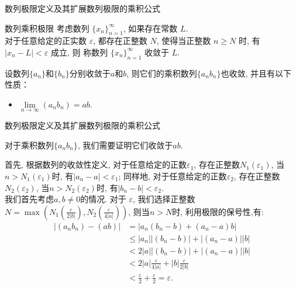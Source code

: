 \documentclass[
10pt,
aspectratio=43,
]{beamer}
\begin{document}
\begin{frame}{数列极限定义及其扩展}{数列极限的乘积公式}
    \begin{block}{数列乘积极限}
        考虑数列 $\{x_n\}_{n=1}^\infty$, 如果存在{\color{green}常数 $L$}.\\
        {\color{blue}对于任意给定的正实数 $\varepsilon$}, 都存在{\color{red}正整数 $N$, 使得当正整数 $n\geq N$ 时}, {\color{blue}有 $|x_n - L| < \varepsilon$ 成立}, 则{\color{green} 称数列 $\{x_n\}_{n=1}^\infty$ 收敛于 $L$}.
    \end{block}
    \begin{block}{}
        设数列$\{a_n\}$和$\{b_n\}$分别收敛于$a$和$b$, 则它们的乘积数列$\{a_nb_n\}$也收敛, 并且有以下性质：
        \begin{itemize}
            \item $\lim\limits_{n \to \infty}(a_n  b_n) = a b$.
        \end{itemize}
    \end{block}
\end{frame}
\begin{frame}{数列极限定义及其扩展}{数列极限的乘积公式}
    \begin{block}{}
        对于乘积数列$\{a_n b_n\}$, 我们需要证明它们收敛于$a b$.

        首先, 根据数列的收敛性定义, 对于任意给定的正数$\varepsilon_1$, 存在正整数$N_1(\varepsilon_1)$, 当$n > N_1(\varepsilon_1)$时, 有$|a_n - a| < \varepsilon_1$; 同样地, 对于任意给定的正数$\varepsilon_2$, 存在正整数$N_2(\varepsilon_2)$, 当$n > N_2(\varepsilon_2)$时, 有$|b_n - b| < \varepsilon_2$.\\
        \vspace{0.2cm}
        我们首先考虑$a,b\neq0$的情况. 对于 $\varepsilon$, 我们选择正整数$N = \max(N_1(\frac{\varepsilon}{2|b|}), N_2(\frac{\varepsilon}{4|a|}))$, 则当$n > N$时, 利用极限的保号性,有:
        \begin{align*}
            |(a_n b_n) - (a  b)| & = |a_n(b_n - b)+(a_n - a)b|                                    \\
                                 & \leq |a_n||(b_n - b)|+|(a_n - a)||b|                           \\
                                 & < 2|a||(b_n - b)|+|(a_n - a)||b|                               \\
                                 & < 2|a|\frac{\varepsilon}{4|a|} + |b|\frac{\varepsilon}{2|b|}   \\
                                 & < \frac{\varepsilon}{2} + \frac{\varepsilon}{2} = \varepsilon.
        \end{align*}
    \end{block}
\end{frame}
\end{document}
